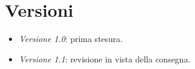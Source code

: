 \documentclass[11pt, a4paper]{article}
\theoremstyle{definition}
\begin{document}
\newpage
\section*{Versioni}
\begin{itemize}
  \item \textit{Versione 1.0}: prima stesura.
  \item \textit{Versione 1.1}: revisione in vista della consegna.
\end{itemize}
\end{document}
